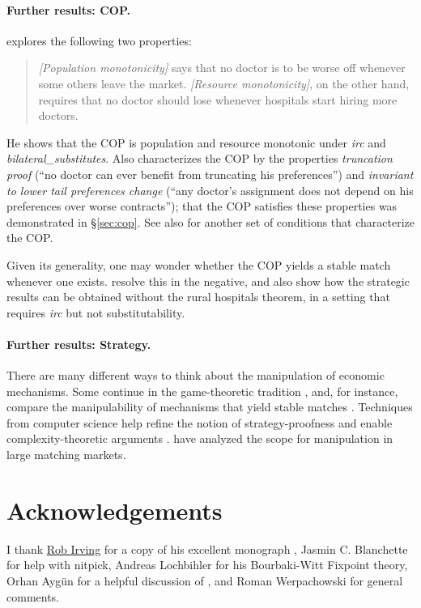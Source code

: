 \documentclass[11pt,a4paper]{article}
\begin{document}
\paragraph{Further results: COP.} \citet{Afacan:2014} explores the
following two properties:
\begin{quote}

  \emph{[Population monotonicity]} says that no doctor is to be worse
  off whenever some others leave the market. \emph{[Resource
    monotonicity]}, on the other hand, requires that no doctor should
  lose whenever hospitals start hiring more doctors.

\end{quote}
He shows that the COP is population and resource monotonic under
\emph{irc} and \emph{bilateral\_substitutes}. Also \citet{Afacan:2015}
characterizes the COP by the properties \emph{truncation proof} (``no
doctor can ever benefit from truncating his preferences'') and
\emph{invariant to lower tail preferences change} (``any doctor's
assignment does not depend on his preferences over worse contracts'');
that the COP satisfies these properties was demonstrated in
\S\ref{sec:cop}. See also \citet{HatfieldKominersWestkamp:2016} for
another set of conditions that characterize the COP.

Given its generality, one may wonder whether the COP yields a stable
match whenever one exists. \citet{HirataKasuya:2016} resolve this in
the negative, and also show how the strategic results can be obtained
without the rural hospitals theorem, in a setting that requires
\emph{irc} but not substitutability.

\paragraph{Further results: Strategy.} There are many different ways
to think about the manipulation of economic mechanisms. Some continue
in the game-theoretic tradition \citep{Gonczarowski:2014}, and, for
instance, compare the manipulability of mechanisms that yield stable
matches \citep{ChenEgesdalPyciaUenmez:2016}. Techniques from computer
science help refine the notion of strategy-proofness
\citep{AshlagiGonczarowski:2015} and enable complexity-theoretic
arguments
\citep{DBLP:conf/atal/AzizSW15,DengShenTang:2016}. \citet{KojimaPathak:2009}
have analyzed the scope for manipulation in large matching markets.


\section{Acknowledgements}

I thank \href{http://www.dcs.gla.ac.uk/~rwi/}{Rob Irving} for a copy
of his excellent monograph \citep{GusfieldIrving:1989}, Jasmin
C. Blanchette for help with nitpick, Andreas Lochbihler for his
Bourbaki-Witt Fixpoint theory, Orhan Aygün for a helpful discussion of
\citet{AygunSonmez:2012-WP}, and Roman Werpachowski for general
comments.



\end{document}
